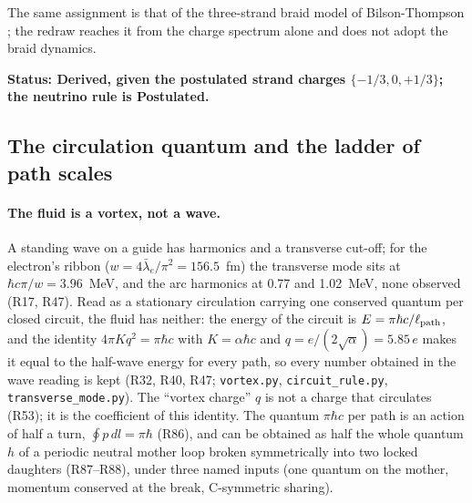 \documentclass[11pt,a4paper]{article}
\theoremstyle{plain}
\theoremstyle{remark}
\newcommand{\lb}{\ensuremath{\bar\lambda_e}}
\newcommand{\status}[1]{\medskip\noindent\textbf{Status: #1.}\ }
\begin{document}
The same assignment is that of the three-strand braid model of Bilson-Thompson
\cite{bilsonthompson}; the redraw reaches it from the charge spectrum alone and does not adopt the
braid dynamics.

\status{Derived, given the postulated strand charges $\{-1/3, 0, +1/3\}$; the neutrino rule is
Postulated}

\subsection{The circulation quantum and the ladder of path scales}\label{sec:ladder}

\paragraph{The fluid is a vortex, not a wave.} A standing wave on a guide has harmonics and a
transverse cut-off; for the electron's ribbon ($w = 4\lb/\pi^2 = 156.5$~fm) the transverse mode
sits at $\hbar c\pi/w = 3.96$~MeV, and the arc harmonics at 0.77 and 1.02~MeV, none observed (R17,
R47). Read as a stationary circulation carrying one conserved quantum per closed circuit, the
fluid has neither: the energy of the circuit is $E = \pi\hbar c/\ell_{\rm path}$, and the identity
$4\pi K q^2 = \pi\hbar c$ with $K = \alpha\hbar c$ and $q = e/(2\sqrt\alpha) = 5.85\,e$ makes it
equal to the half-wave energy for every path, so every number obtained in the wave reading is
kept (R32, R40, R47; \texttt{vortex.py}, \texttt{circuit\_rule.py}, \texttt{transverse\_mode.py}).
The ``vortex charge'' $q$ is not a charge that circulates (R53); it is the coefficient of this
identity. The quantum $\pi\hbar c$ per path is an action of half a turn, $\oint p\,dl = \pi\hbar$
(R86), and can be obtained as half the whole quantum $h$ of a periodic neutral mother loop broken
symmetrically into two locked daughters (R87--R88), under three named inputs (one quantum on the
mother, momentum conserved at the break, C-symmetric sharing).
\end{document}
